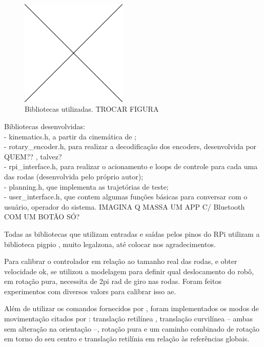 \begin{figure}[h]
  \centering
  \includegraphics[width = 0.45\textwidth]{imagens/edc}
  \caption{Bibliotecas utilizadas. TROCAR FIGURA}
  \label{fig:libs}
\end{figure}

Bibliotecas desenvolvidas: \\
- kinematics.h, a partir da cinemática de \cite{ritter2016modelagem}; \\
- rotary\_encoder.h, para realizar a decodificação dos encoders, desenvolvida por QUEM?? \cite{pigpio}, talvez?\\
- rpi\_interface.h, para realizar o acionamento e loops de controle para cada uma das rodas (desenvolvida pelo próprio autor);\\
- planning.h, que implementa as trajetórias de teste; \\
- user\_interface.h, que contem algumas funções básicas para conversar com o usuário, operador do sistema. IMAGINA Q MASSA UM APP C/ Bluetooth COM UM BOTÃO SÓ?

Todas as bibliotecas que utilizam entradas e saídas pelos pinos do RPi utilizam a biblioteca pigpio \citet{pigpio}, muito legalzona, até colocar nos agradecimentos.

Para calibrar o controlador em relação ao tamanho real das rodas, e obter velocidade ok, se utilizou a modelagem para definir qual deslocamento do robô, em rotação pura, necessita de 2pi rad de giro nas rodas. Foram feitos experimentos com diversos valors para calibrar isso ae.

Além de utilizar os comandos fornecidos por \citet{ritter2016modelagem}, foram implementados os modos de movimentação citados por \citet{loh2003mechatronics}: translação retilínea , translação curvilínea -- ambas sem alteração na orientação --, rotação pura e um caminho combinado de rotação em torno do seu centro e translação retilínia em relação às referências globais.

